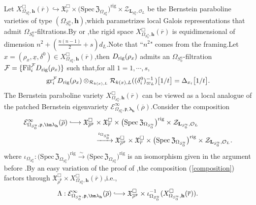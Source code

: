 \documentclass[10pt]{article}
\newcommand{\hooklongrightarrow}{\lhook\joinrel\longrightarrow}
\newcommand{\rig}{{\rm rig}}
\newcommand{\fil}{{\rm Fil}}
\newcommand{\undelram}{{\delta^0}}
\newcommand{\gr}{{\rm gr}}
\newcommand{\sbanpiku}{{\big(\mathrm{Spec}\hspace{2pt}\FZ_{\Omega_{S^u_0}}\big)^{\mathrm{rig}}}}
\newcommand{\rigchu}{{\mathcal{Z}_{\bL_{S^u_0},\mathcal{O}_L}}}
\newcommand{\omepik}{\Omega_{S^u_0}}
\newcommand{\defvaru}{{X^\Box_{\omepik,\mathbf{{h}}}(\overline{r})}}
\newcommand{\defvarrho}{{X^\Box_{\omepik,\mathbf{{h}}}(\overline{r})}}
\newcommand{\bL}{{\mathbf{L}}}
\newcommand{\bh}{{\mathbf{h}}}
\newcommand{\cR}{\mathcal R}
\newcommand{\cF}{\mathcal F}
\newcommand{\FX}{{\mathfrak{X}}}
\newcommand{\FZ}{{\mathfrak{Z}}}
\newcommand{\fp}{{\mathfrak{p}}}
\begin{document}
Let $\defvaru\hookrightarrow\mathfrak{X}_{\overline{r}}^\Box\times \sbanpiku\times\rigchu$ be the  Bernstein paraboline varieties \cite[Section 4.2]{Ding2021} of type {$(\omepik,\bh)$},\;which parametrizes local Galois representations that admit $\Omega_{S_0^u}$-filtrations.\;By \cite[Theorem 4.2.5,\;Corollary 4.2.5]{Ding2021} or \cite[Proposition 4.2]{He20222},\;the rigid space $\defvaru$ is equidimensional of dimension $n^2+\left(\frac{n(n-1)}{2}+s\right)d_L$.\;Note that ``$n^2$" comes from the framing.\;Let $x=(\rho_x,\underline{x},\undelram)\in \defvaru$,\;then $D_{\rig}(\rho_x)$ admits an $\omepik$-filtration $\cF=\{\fil_i^\cF D_{\rig}(\rho_x)\}$ such that,\;for all $1=1,\cdots,s$,\;
\[\gr_{i}^{\cF}D_{\rig}(\rho_x)\otimes_{\cR_{k(x),L}}\cR_{k(x),L}((\delta_i^0)^{-1}_{\varpi_L})\big[1/t\big]=\Delta_{x_i}\big[1/t\big].\]
The Bernstein paraboline variety $\defvaru$ can be viewed as a local analogue of the patched Bernstein eigenvariety $\mathcal{E}_{\omepik,\fp,{\bm\lambda}_\bh}^\infty(\overline{\rho})$.\;Consider the composition
\begin{equation}\label{composition}
	\begin{aligned}
		\mathcal{E}_{\omepik,\fp,{\bm\lambda}_\bh}^\infty(\overline{\rho})\hooklongrightarrow \FX_{\overline{\rho}^{\fp}}^\Box&\times \mathfrak{X}_{\overline{r}}^\Box \times \sbanpiku\times \rigchu\\
		&\xrightarrow{\iota_{\omepik}} \FX_{\overline{\rho}^{\fp}}^\Box\times \mathfrak{X}_{\overline{r}}^\Box \times \sbanpiku\times \rigchu.
	\end{aligned}
\end{equation}
where $\iota_{\omepik}:\sbanpiku\xrightarrow{\sim}\sbanpiku$ is an isomorphism given in the argument before \cite[(3.32)]{Ding2021}.\;By an easy variation of the proof of \cite[Theorem 3.3.9]{Ding2021},\;the composition (\ref{composition}) factors through $\FX_{\overline{\rho}^{\fp}}^\Box\times \defvarrho$,\;i.e.,\;
\begin{equation}\label{mapbersteineigenvarpikdefvarrho}
	\Lambda:\mathcal{E}_{\omepik,\fp,{\bm\lambda}_\bh}^\infty(\overline{\rho})\hooklongrightarrow \FX_{\overline{\rho}^{\fp}}^\Box\times \iota_{\omepik}^{-1}(\defvaru).
\end{equation}	
\end{document}
